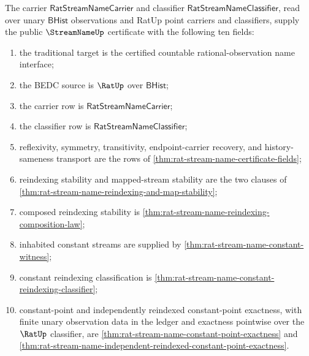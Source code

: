 \begin{theorem}
\label{thm:rat-stream-name-public-certificate}
The carrier $\mathsf{RatStreamNameCarrier}$ and classifier
$\mathsf{RatStreamNameClassifier}$, read over unary $\mathsf{BHist}$
observations and RatUp point carriers and classifiers, supply the public
$\StreamNameUp$ certificate with the following ten fields:
\begin{enumerate}
  \item the traditional target is the certified countable rational-observation
  name interface;
  \item the BEDC source is $\RatUp$ over $\mathsf{BHist}$;
  \item the carrier row is $\mathsf{RatStreamNameCarrier}$;
  \item the classifier row is $\mathsf{RatStreamNameClassifier}$;
  \item reflexivity, symmetry, transitivity, endpoint-carrier recovery, and
  history-sameness transport are the rows of
  \autoref{thm:rat-stream-name-certificate-fields};
  \item reindexing stability and mapped-stream stability are the two clauses of
  \autoref{thm:rat-stream-name-reindexing-and-map-stability};
  \item composed reindexing stability is
  \autoref{thm:rat-stream-name-reindexing-composition-law};
  \item inhabited constant streams are supplied by
  \autoref{thm:rat-stream-name-constant-witness};
  \item constant reindexing classification is
  \autoref{thm:rat-stream-name-constant-reindexing-classifier};
  \item constant-point and independently reindexed constant-point exactness,
  with finite unary observation data in the ledger and exactness pointwise over
  the $\RatUp$ classifier, are
  \autoref{thm:rat-stream-name-constant-point-exactness} and
  \autoref{thm:rat-stream-name-independent-reindexed-constant-point-exactness}.
\end{enumerate}
\end{theorem}
